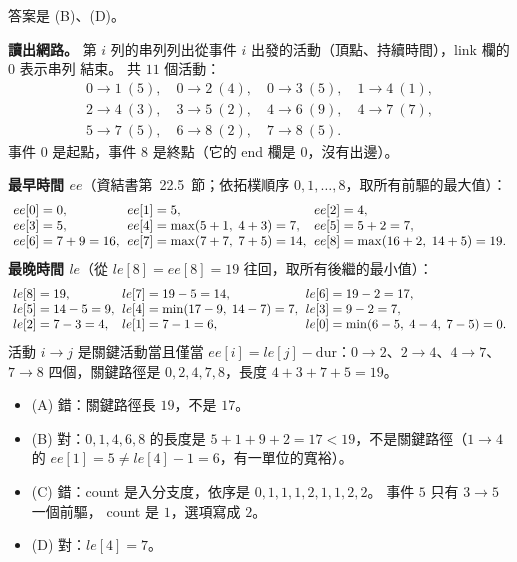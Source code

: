 \begin{pastsoln}
答案是 (B)、(D)。

\textbf{讀出網路。} 第 $i$ 列的串列列出從事件 $i$ 出發的活動（頂點、持續時間），link 欄的 $0$ 表示串列
結束。 共 $11$ 個活動：
\[
\begin{array}{l}
0 \to 1\ (5),\quad 0 \to 2\ (4),\quad 0 \to 3\ (5),\quad 1 \to 4\ (1),\\
2 \to 4\ (3),\quad 3 \to 5\ (2),\quad 4 \to 6\ (9),\quad 4 \to 7\ (7),\\
5 \to 7\ (5),\quad 6 \to 8\ (2),\quad 7 \to 8\ (5).
\end{array}
\]
事件 $0$ 是起點，事件 $8$ 是終點（它的 end 欄是 $0$，沒有出邊）。

\textbf{最早時間 $ee$}（資結書第~22.5~節；依拓樸順序 $0, 1, \ldots, 8$，取所有前驅的最大值）：
\[
\arraycolsep=3pt
\begin{array}{lll}
ee[0] = 0, & ee[1] = 5, & ee[2] = 4, \\
ee[3] = 5, & ee[4] = \max(5 + 1,\; 4 + 3) = 7, & ee[5] = 5 + 2 = 7, \\
ee[6] = 7 + 9 = 16, & ee[7] = \max(7 + 7,\; 7 + 5) = 14, & ee[8] = \max(16 + 2,\; 14 + 5) = 19.
\end{array}
\]
\textbf{最晚時間 $le$}（從 $le[8] = ee[8] = 19$ 往回，取所有後繼的最小值）：
\[
\arraycolsep=3pt
\begin{array}{lll}
le[8] = 19, & le[7] = 19 - 5 = 14, & le[6] = 19 - 2 = 17, \\
le[5] = 14 - 5 = 9, & le[4] = \min(17 - 9,\; 14 - 7) = 7, & le[3] = 9 - 2 = 7, \\
le[2] = 7 - 3 = 4, & le[1] = 7 - 1 = 6, & le[0] = \min(6 - 5,\; 4 - 4,\; 7 - 5) = 0.
\end{array}
\]
活動 $i \to j$ 是關鍵活動當且僅當 $ee[i] = le[j] - \text{dur}$：$0 \to 2$、$2 \to 4$、$4 \to 7$、$7 \to 8$
四個，關鍵路徑是 $0, 2, 4, 7, 8$，長度 $4 + 3 + 7 + 5 = 19$。
\begin{itemize}
\item (A) 錯：關鍵路徑長 $19$，不是 $17$。
\item (B) 對：$0, 1, 4, 6, 8$ 的長度是 $5 + 1 + 9 + 2 = 17 < 19$，不是關鍵路徑（$1 \to 4$ 的
$ee[1] = 5 \ne le[4] - 1 = 6$，有一單位的寬裕）。
\item (C) 錯：count 是入分支度，依序是 $0, 1, 1, 1, 2, 1, 1, 2, 2$。 事件 $5$ 只有 $3 \to 5$ 一個前驅，
count 是 $1$，選項寫成 $2$。
\item (D) 對：$le[4] = 7$。
\end{itemize}
\end{pastsoln}
